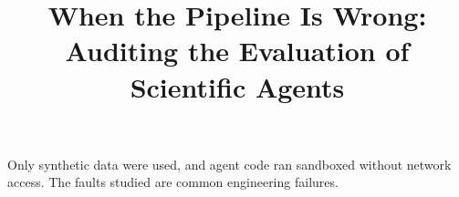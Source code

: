 \documentclass[11pt,a4paper]{article}
\title[When the Pipeline Is Wrong]{When the Pipeline Is Wrong: Auditing the Evaluation of Scientific Agents}
\begin{document}
\maketitle
\setlength{\emergencystretch}{3em}\sloppy







Only synthetic data were used, and agent code ran sandboxed without network
access. The faults studied are common engineering failures.



\appendix

\end{document}

